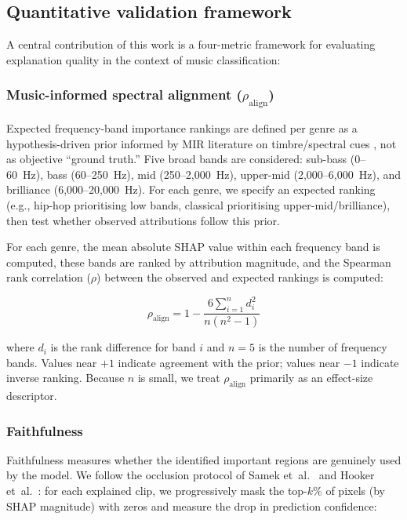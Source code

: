 \documentclass{article}
\begin{document}
\subsection{Quantitative validation framework}\label{subsec:validation}

A central contribution of this work is a four-metric framework for evaluating explanation quality in the context of music classification:

\subsubsection{Music-informed spectral alignment ($\rho_{\text{align}}$)}

Expected frequency-band importance rankings are defined per genre as a hypothesis-driven prior informed by MIR literature on timbre/spectral cues \cite{Tzanetakis2002,Fu2011}, not as objective ``ground truth.'' Five broad bands are considered: sub-bass (0--60~Hz), bass (60--250~Hz), mid (250--2,000~Hz), upper-mid (2,000--6,000~Hz), and brilliance (6,000--20,000~Hz). For each genre, we specify an expected ranking (e.g., hip-hop prioritising low bands, classical prioritising upper-mid/brilliance), then test whether observed attributions follow this prior.

For each genre, the mean absolute SHAP value within each frequency band is computed, these bands are ranked by attribution magnitude, and the Spearman rank correlation ($\rho$) between the observed and expected rankings is computed:

\begin{equation}\label{eq:alignment}
\rho_{\text{align}} = 1 - \frac{6 \sum_{i=1}^{n} d_i^2}{n(n^2 - 1)}
\end{equation}

\noindent where $d_i$ is the rank difference for band $i$ and $n = 5$ is the number of frequency bands. Values near $+1$ indicate agreement with the prior; values near $-1$ indicate inverse ranking. Because $n$ is small, we treat $\rho_{\text{align}}$ primarily as an effect-size descriptor.

\subsubsection{Faithfulness}

Faithfulness measures whether the identified important regions are genuinely used by the model. We follow the occlusion protocol of Samek et~al.\ \cite{Samek2017} and Hooker et~al.\ \cite{Hooker2019}: for each explained clip, we progressively mask the top-$k$\% of pixels (by SHAP magnitude) with zeros and measure the drop in prediction confidence:
\end{document}

